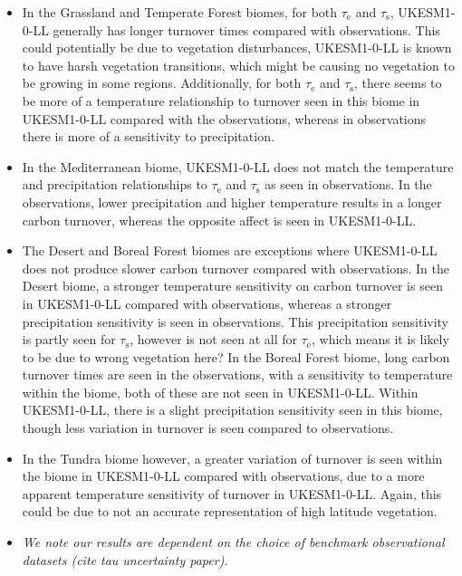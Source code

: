 \documentclass[bg, manuscript]{copernicus}
\begin{document}
\begin{itemize}
	\item In the Grassland and Temperate Forest biomes, for both $\tau_\mathrm{e}$ and $\tau_\mathrm{s}$, UKESM1-0-LL generally has longer turnover times compared with observations. This could potentially be due to vegetation disturbances, UKESM1-0-LL is known to have harsh vegetation transitions, which might be causing no vegetation to be growing in some regions. Additionally, for both $\tau_\mathrm{e}$ and $\tau_\mathrm{s}$, there seems to be more of a temperature relationship to turnover seen in this biome in UKESM1-0-LL compared with the observations, whereas in observations there is more of a sensitivity to precipitation.
	
	\item In the Mediterranean biome, UKESM1-0-LL does not match the temperature and precipitation relationships to $\tau_\mathrm{e}$ and $\tau_\mathrm{s}$ as seen in observations. In the observations, lower precipitation and higher temperature results in a longer carbon turnover, whereas the opposite affect is seen in UKESM1-0-LL.
	
	\item The Desert and Boreal Forest biomes are exceptions where UKESM1-0-LL does not produce slower carbon turnover compared with observations. In the Desert biome, a stronger temperature sensitivity on carbon turnover is seen in UKESM1-0-LL compared with observations, whereas a stronger precipitation sensitivity is seen in observations. This precipitation sensitivity is partly seen for $\tau_\mathrm{s}$, however is not seen at all for $\tau_\mathrm{e}$, which means it is likely to be due to wrong vegetation here? In the Boreal Forest biome, long carbon turnover times are seen in the observations, with a sensitivity to temperature within the biome, both of these are not seen in UKESM1-0-LL. Within UKESM1-0-LL, there is a slight precipitation sensitivity seen in this biome, though less variation in turnover is seen compared to observations.

	\item In the Tundra biome however, a greater variation of turnover is seen within the biome in UKESM1-0-LL compared with observations, due to a more apparent temperature sensitivity of turnover in UKESM1-0-LL. Again, this could be due to not an accurate representation of high latitude vegetation.
	
	\item \textit{We note our results are dependent on the choice of benchmark observational datasets (cite tau uncertainty paper).}

\end{itemize}
\end{document}
